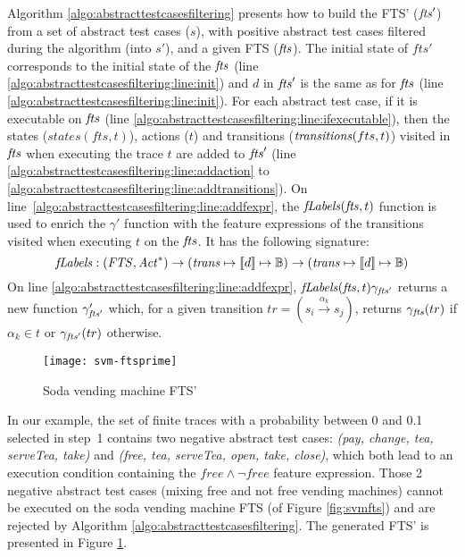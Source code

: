 Algorithm \ref{algo:abstracttestcasesfiltering} presents how to build the FTS' ($\mathit{fts}'$) from a set of abstract test cases ($s$), with positive abstract test cases filtered during the algorithm (into $s'$), and a given FTS ($\mathit{fts}$). 
The initial state of $fts'$ corresponds to the initial state of the $\mathit{fts}$ (line \ref{algo:abstracttestcasesfiltering:line:init}) and $d$ in $\mathit{fts}'$ is the same as for $\mathit{fts}$ (line \ref{algo:abstracttestcasesfiltering:line:init}). 
For each abstract test case, if it is executable on $\mathit{fts}$ (line \ref{algo:abstracttestcasesfiltering:line:ifexecutable}), then the states ($states(fts, t)$), actions ($t$) and transitions ($\mathit{transitions}(fts, t)$) visited in $\mathit{fts}$ when executing the trace $t$ are added to $\mathit{fts}'$ (line \ref{algo:abstracttestcasesfiltering:line:addaction} to \ref{algo:abstracttestcasesfiltering:line:addtransitions}). 
%
On line~\ref{algo:abstracttestcasesfiltering:line:addfexpr}, the $\mathit{fLabels}(\mathit{fts}, t)$ function is used to enrich the $\gamma'$ function with the feature expressions of the transitions visited when executing $t$ on the $\mathit{fts}$. It has the following signature: 
%
$$\mathit{fLabels} : (\mathit{FTS}, \mathit{Act}^{*}) \rightarrow (\mathit{trans} \mapsto [\![ d]\!] \mapsto \mathbb{B}) \rightarrow (\mathit{trans} \mapsto [\![ d]\!] \mapsto \mathbb{B})$$
%
On line \ref{algo:abstracttestcasesfiltering:line:addfexpr}, $\mathit{fLabels} (\mathit{fts}, t) \gamma_{\mathit{fts}'}$ returns a new function $\gamma'_{\mathit{fts}'}$ which, for a given transition $tr = (s_i \overset{\alpha_k}{\longrightarrow}  s_{j}) $, returns $\gamma_{\mathit{fts}} (tr)$ if $\alpha_k \in t$ or $\gamma_{\mathit{fts}'} (tr)$ otherwise.

\begin{figure}
	\centering
	\texttt{[image: svm-ftsprime]}
	\caption{Soda vending machine FTS'}
	\label{fig:svmftsprime}
\end{figure}

In our example, the set of finite traces with a probability between 0 and 0.1 selected in step~1 contains two negative abstract test cases: \textit{(pay, change, tea, serve\-Tea, take)} and \textit{(free, tea, serve\-Tea, open, take, close)}, which both lead to an execution condition containing the $free \wedge \neg free$ feature expression. Those 2 negative abstract test cases (mixing free and not free vending machines) cannot be executed on the soda vending machine  FTS (of Figure \ref{fig:svmfts}) and are rejected by Algorithm \ref{algo:abstracttestcasesfiltering}. The generated FTS' is presented in Figure \ref{fig:svmftsprime}.

